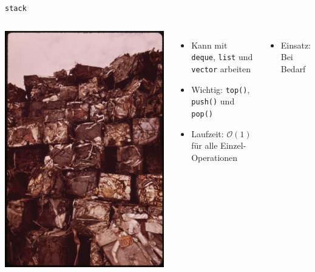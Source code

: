 \begin{frame}{\texttt{stack}}
	\begin{columns}
			\includegraphics[width=\linewidth]{images/stack.jpg}
			
			\begin{itemize}
				\item Kann mit \texttt{deque}, \texttt{list} und \texttt{vector} arbeiten
				\item Wichtig: \texttt{top()}, \texttt{push()} und \texttt{pop()}
				\item Laufzeit: $\mathcal{O}(1)$ für alle Einzel-Operationen
			\end{itemize}
			
			\vspace{1em}
			
			\begin{itemize}
				\item Einsatz: Bei Bedarf
			\end{itemize}
	\end{columns}
\end{frame}

